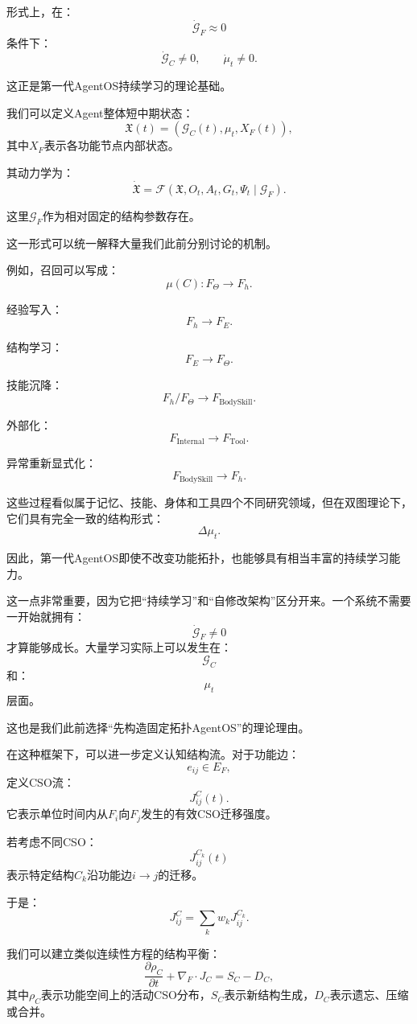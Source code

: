 形式上，在：
\[
\dot{\mathcal G}_F\approx0
\]
条件下：
\[
\dot{\mathcal G}_C\neq0,
\qquad
\dot\mu_t\neq0.
\]

这正是第一代AgentOS持续学习的理论基础。

我们可以定义Agent整体短中期状态：
\[
\mathfrak X(t)
=
\left(
\mathcal G_C(t),
\mu_t,
X_F(t)
\right),
\]
其中$X_F$表示各功能节点内部状态。

其动力学为：
\[
\dot{\mathfrak X}
=
\mathcal F
\left(
\mathfrak X,
O_t,
A_t,
G_t,
\Psi_t
\mid
\mathcal G_F
\right).
\]

这里$\mathcal G_F$作为相对固定的结构参数存在。

这一形式可以统一解释大量我们此前分别讨论的机制。

例如，召回可以写成：
\[
\mu(C):
F_\Theta
\rightarrow
F_h.
\]

经验写入：
\[
F_h
\rightarrow
F_E.
\]

结构学习：
\[
F_E
\rightarrow
F_\Theta.
\]

技能沉降：
\[
F_h/F_\Theta
\rightarrow
F_{\text{BodySkill}}.
\]

外部化：
\[
F_{\text{Internal}}
\rightarrow
F_{\text{Tool}}.
\]

异常重新显式化：
\[
F_{\text{BodySkill}}
\rightarrow
F_h.
\]

这些过程看似属于记忆、技能、身体和工具四个不同研究领域，但在双图理论下，它们具有完全一致的结构形式：
\[
\boxed{
\Delta\mu_t.
}
\]

因此，第一代AgentOS即使不改变功能拓扑，也能够具有相当丰富的持续学习能力。

这一点非常重要，因为它把“持续学习”和“自修改架构”区分开来。一个系统不需要一开始就拥有：
\[
\dot{\mathcal G}_F\neq0
\]
才算能够成长。大量学习实际上可以发生在：
\[
\mathcal G_C
\]
和：
\[
\mu_t
\]
层面。

这也是我们此前选择“先构造固定拓扑AgentOS”的理论理由。

在这种框架下，可以进一步定义认知结构流。对于功能边：
\[
e_{ij}\in E_F,
\]
定义CSO流：
\[
J^{C}_{ij}(t).
\]
它表示单位时间内从$F_i$向$F_j$发生的有效CSO迁移强度。

若考虑不同CSO：
\[
J^{C_k}_{ij}(t)
\]
表示特定结构$C_k$沿功能边$i\rightarrow j$的迁移。

于是：
\[
J^{C}_{ij}
=
\sum_k
w_kJ^{C_k}_{ij}.
\]

我们可以建立类似连续性方程的结构平衡：
\[
\frac{\partial\rho_C}{\partial t}
+
\nabla_F\cdot J_C
=
S_C-D_C,
\]
其中$\rho_C$表示功能空间上的活动CSO分布，$S_C$表示新结构生成，$D_C$表示遗忘、压缩或合并。

